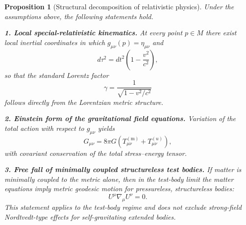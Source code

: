 \documentclass[12pt,a4paper]{article}
\newtheorem{proposition}{Proposition}
\newcommand{\Tmm}{T^{(\mathrm{m})}_{\mu\nu}}
\newcommand{\Tuu}{T^{(u)}_{\mu\nu}}
\begin{document}
            \begin{proposition}[Structural decomposition of relativistic physics]
                \label{prop:main}
                Under the assumptions above, the following statements hold.
                
                \medskip
                \noindent
                \textbf{1. Local special-relativistic kinematics.}
                At every point $p\in M$ there exist local inertial coordinates in which
                $g_{\mu\nu}(p)=\eta_{\mu\nu}$ and
                \begin{equation}
                    d\tau^2 = dt^2\left(1-\frac{v^2}{c^2}\right),
                \end{equation}
                so that the standard Lorentz factor
                \begin{equation}
                    \gamma = \frac{1}{\sqrt{1-v^2/c^2}}
                \end{equation}
                follows directly from the Lorentzian metric structure.
                
                \medskip
                \noindent
                \textbf{2. Einstein form of the gravitational field equations.}
                Variation of the total action with respect to $g_{\mu\nu}$ yields
                \begin{equation}
                    G_{\mu\nu}=8\pi G\left(\Tmm+\Tuu\right),
                    \label{eq:field_eqs}
                \end{equation}
                with covariant conservation of the total stress--energy tensor.
                
                \medskip
                \noindent
                \textbf{3. Free fall of minimally coupled structureless test bodies.}
                If matter is minimally coupled to the metric alone, then in the test-body limit
                the matter equations imply metric geodesic motion for pressureless,
                structureless bodies:
                \begin{equation}
                    U^\mu \nabla_\mu U^\nu = 0.
                    \label{eq:geodesic}
                \end{equation}
                This statement applies to the test-body regime and does not exclude strong-field
                Nordtvedt-type effects for self-gravitating extended bodies.
            \end{proposition}
            
\end{document}

